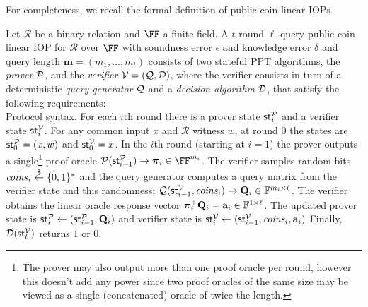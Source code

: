 For completeness, we recall the formal definition of public-coin linear IOPs. %

\begin{definition} 
\label{def:linearIOP}
Let $\mathcal{R}$ be a binary relation and $\FF$ a finite field. A $t$-round $\ell$-query public-coin linear IOP for $\mathcal{R}$ over $\FF$ with soundness error $\epsilon$ and knowledge error $\delta$ and query length $\mathbf{m} = (m_1,...,m_t)$ consists of two stateful PPT algorithms, the \emph{prover} $\mathcal{P}$, and the
\emph{verifier} $\mathcal{V} = (\mathcal{Q}, \mathcal{D})$, where the verifier consists in turn of a deterministic \emph{query generator} $\mathcal{Q}$ and a
\emph{decision algorithm} $\mathcal{D}$, that satisfy the following requirements:\\
 
\noindent \underline{Protocol syntax}. 
For each $i$th round there is a prover state $\textsf{st}^\mathcal{P}_i$ and a verifier state $\textsf{st}^\mathcal{V}_i$. For any common input $x$ and $\mathcal{R}$ witness $w$, at round 0 the states are $\textsf{st}^\mathcal{P}_0 = (x, w)$ and $\textsf{st}^\mathcal{V}_0 = x$. 
In the $i$th round (starting at $i = 1$) the prover outputs a single\footnote{The prover may also output more than one proof oracle per round, however this doesn't add any power since two proof oracles of the same size may be viewed as a single (concatenated) oracle of twice the length.} proof oracle $\prover(\textsf{st}^\prover_{i-1}) \rightarrow \proofO_i \in \FF^{m_i}$. The verifier samples random bits $\mathit{coins}_i \overset{\$}{\gets} \{0,1\}^*$ and the query generator computes a query matrix from the verifier state and this randomness: $\mathcal{Q}(\textsf{st}^\mathcal{V}_{i-1}, \mathit{coins}_i) \rightarrow \mathbf{Q}_i \in \mathbb{F}^{m_i \times \ell}$. The verifier obtains the linear oracle response vector $\boldsymbol{\pi}_i^\top \mathbf{Q}_i = \mathbf{a}_i \in \mathbb{F}^{1 \times \ell}$. The updated prover state is $\textsf{st}^\mathcal{P}_i \leftarrow (\textsf{st}^\mathcal{P}_{i-1}, \mathbf{Q}_i)$
and verifier state is $\textsf{st}^\mathcal{V}_i \leftarrow (\textsf{st}^\mathcal{V}_{i-1}, \mathit{coins}_i, \mathbf{a}_i)$
Finally, $\mathcal{D}(\textsf{st}^\mathcal{V}_t)$ returns $1$ or $0$. \\ 


\end{definition}
